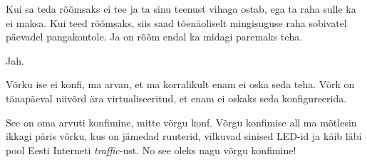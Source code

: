 Kui sa teda rõõmsaks ei tee ja ta sinu teenust vihaga ostab, ega  ta raha sulle 
ka ei maksa. Kui teed rõõmsaks, siis saad tõenäoliselt mingisuguse raha 
sobivatel päevadel pangakontole. Ja on rõõm endal ka midagi paremaks teha.


Jah.


Võrku ise ei konfi, ma arvan, et ma korralikult enam ei oska seda teha. Võrk on 
tänapäeval  niivõrd ära virtualiseeritud, et enam ei oskaks seda konfigureerida.


See on oma arvuti konfimine, mitte võrgu konf. Võrgu konfimise all ma mõtlesin 
ikkagi päris võrku, kus on jämedad ruuterid, vilkuvad sinised LED-id ja käib 
läbi pool Eesti Interneti \emph{traffic}-ust. No see oleks nagu võrgu 
konfimine! 

